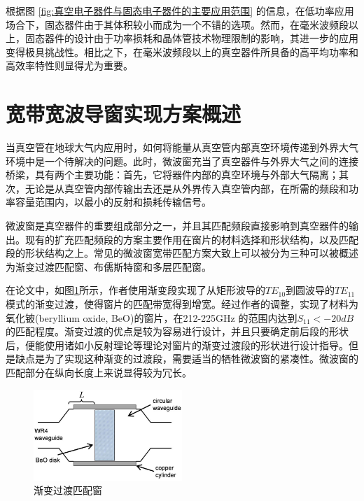 \documentclass[master]{thesis-uestc}
\begin{document}
根据图 \ref{fig:真空电子器件与固态电子器件的主要应用范围} 的信息，在低功率应用场合下，固态器件由于其体积较小而成为一个不错的选项。然而，在毫米波频段以上，固态器件的设计由于功率损耗和晶体管技术物理限制的影响，其进一步的应用变得极具挑战性。相比之下，在毫米波频段以上的真空器件所具备的高平均功率和高效率特性则显得尤为重要。


\section{宽带宽波导窗实现方案概述}
当真空管在地球大气内应用时，如何将能量从真空管内部真空环境传递到外界大气环境中是一个待解决的问题。此时，微波窗充当了真空器件与外界大气之间的连接桥梁，具有两个主要功能：首先，它将器件内部的真空环境与外部大气隔离；其次，无论是从真空管内部传输出去还是从外界传入真空管内部，在所需的频段和功率容量范围内，以最小的反射和损耗传输信号。

微波窗是真空器件的重要组成部分之一，并且其匹配频段直接影响到真空器件的输出。现有的扩充匹配频段的方案主要作用在窗片的材料选择和形状结构，以及匹配段的形状结构之上。常见的微波窗宽带匹配方案大致上可以被分为三种可以被概述为渐变过渡匹配窗、布儒斯特窗和多层匹配窗。

在论文\cite{cook_broadband_2013_gradually}中，如图\ref{fig:渐变过渡匹配窗}所示，作者使用渐变段实现了从矩形波导的$TE_{10}$到圆波导的$TE_{11}$模式的渐变过渡，使得窗片的匹配带宽得到增宽。经过作者的调整，实现了材料为氧化铍(beryllium oxide, BeO)的窗片，在212-225GHz 的范围内达到$S_{11}<-20dB$的匹配程度。渐变过渡的优点是较为容易进行设计，并且只要确定前后段的形状后，便能使用诸如小反射理论等理论对窗片的渐变过渡段的形状进行设计指导。但是缺点是为了实现这种渐变的过渡段，需要适当的牺牲微波窗的紧凑性。微波窗的匹配部分在纵向长度上来说显得较为冗长。
\begin{figure}[!htb]
    \centering
    \includegraphics[width=0.5\textwidth]{pic/chapter1/渐变过渡方案.png}
    \caption{渐变过渡匹配窗}
    \label{fig:渐变过渡匹配窗}
\end{figure}
\end{document}
